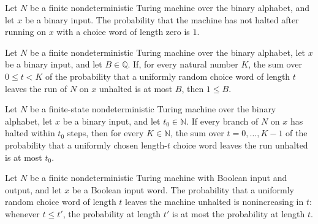\begin{theorem}
\label{Turing.FinNDTM.notHaltedProb_haltRun_zero}
\leanok
{}
Let $N$ be a finite nondeterministic Turing machine over the binary alphabet, and let
$x$ be a binary input. The probability that the machine has not halted after running on
$x$ with a choice word of length zero is $1$.
\end{theorem}

\begin{theorem}
\label{Turing.FinNDTM.ExpTimeLe.one_le}
\leanok
{}
Let $N$ be a finite nondeterministic Turing machine over the binary alphabet, let $x$ be
a binary input, and let $B\in\mathbb{Q}$. If, for every natural number $K$, the sum over
$0\le t<K$ of the probability that a uniformly random choice word of length $t$ leaves
the run of $N$ on $x$ unhalted is at most $B$, then $1\le B$.
\end{theorem}

\begin{theorem}
\label{Turing.FinNDTM.expTimeLe_of_haltsWithin}
\leanok
{}
Let $N$ be a finite-state nondeterministic Turing machine over the binary alphabet, let
$x$ be a binary input, and let $t_0\in\mathbb{N}$. If every branch of $N$ on $x$ has
halted within $t_0$ steps, then for every $K\in\mathbb{N}$, the sum over
$t=0,\ldots,K-1$ of the probability that a uniformly chosen length-$t$ choice word
leaves the run unhalted is at most $t_0$.
\end{theorem}

\begin{theorem}
\label{Turing.FinNDTM.notHaltedProb_haltRun_antitone}
\leanok
{}
Let $N$ be a finite nondeterministic Turing machine with Boolean input and output, and
let $x$ be a Boolean input word. The probability that a uniformly random choice word of
length $t$ leaves the machine unhalted is nonincreasing in $t$: whenever $t\le t'$, the
probability at length $t'$ is at most the probability at length $t$.
\end{theorem}

